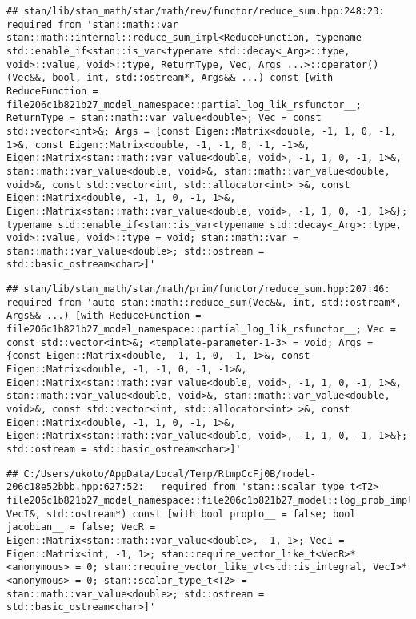 \documentclass[
]{article}
\begin{document}
\begin{verbatim}
## stan/lib/stan_math/stan/math/rev/functor/reduce_sum.hpp:248:23:   required from 'stan::math::var stan::math::internal::reduce_sum_impl<ReduceFunction, typename std::enable_if<stan::is_var<typename std::decay<_Arg>::type, void>::value, void>::type, ReturnType, Vec, Args ...>::operator()(Vec&&, bool, int, std::ostream*, Args&& ...) const [with ReduceFunction = file206c1b821b27_model_namespace::partial_log_lik_rsfunctor__; ReturnType = stan::math::var_value<double>; Vec = const std::vector<int>&; Args = {const Eigen::Matrix<double, -1, 1, 0, -1, 1>&, const Eigen::Matrix<double, -1, -1, 0, -1, -1>&, Eigen::Matrix<stan::math::var_value<double, void>, -1, 1, 0, -1, 1>&, stan::math::var_value<double, void>&, stan::math::var_value<double, void>&, const std::vector<int, std::allocator<int> >&, const Eigen::Matrix<double, -1, 1, 0, -1, 1>&, Eigen::Matrix<stan::math::var_value<double, void>, -1, 1, 0, -1, 1>&}; typename std::enable_if<stan::is_var<typename std::decay<_Arg>::type, void>::value, void>::type = void; stan::math::var = stan::math::var_value<double>; std::ostream = std::basic_ostream<char>]'
\end{verbatim}

\begin{verbatim}
## stan/lib/stan_math/stan/math/prim/functor/reduce_sum.hpp:207:46:   required from 'auto stan::math::reduce_sum(Vec&&, int, std::ostream*, Args&& ...) [with ReduceFunction = file206c1b821b27_model_namespace::partial_log_lik_rsfunctor__; Vec = const std::vector<int>&; <template-parameter-1-3> = void; Args = {const Eigen::Matrix<double, -1, 1, 0, -1, 1>&, const Eigen::Matrix<double, -1, -1, 0, -1, -1>&, Eigen::Matrix<stan::math::var_value<double, void>, -1, 1, 0, -1, 1>&, stan::math::var_value<double, void>&, stan::math::var_value<double, void>&, const std::vector<int, std::allocator<int> >&, const Eigen::Matrix<double, -1, 1, 0, -1, 1>&, Eigen::Matrix<stan::math::var_value<double, void>, -1, 1, 0, -1, 1>&}; std::ostream = std::basic_ostream<char>]'
\end{verbatim}

\begin{verbatim}
## C:/Users/ukoto/AppData/Local/Temp/RtmpCcFj0B/model-206c18e52bbb.hpp:627:52:   required from 'stan::scalar_type_t<T2> file206c1b821b27_model_namespace::file206c1b821b27_model::log_prob_impl(VecR&, VecI&, std::ostream*) const [with bool propto__ = false; bool jacobian__ = false; VecR = Eigen::Matrix<stan::math::var_value<double>, -1, 1>; VecI = Eigen::Matrix<int, -1, 1>; stan::require_vector_like_t<VecR>* <anonymous> = 0; stan::require_vector_like_vt<std::is_integral, VecI>* <anonymous> = 0; stan::scalar_type_t<T2> = stan::math::var_value<double>; std::ostream = std::basic_ostream<char>]'
\end{verbatim}
\end{document}
